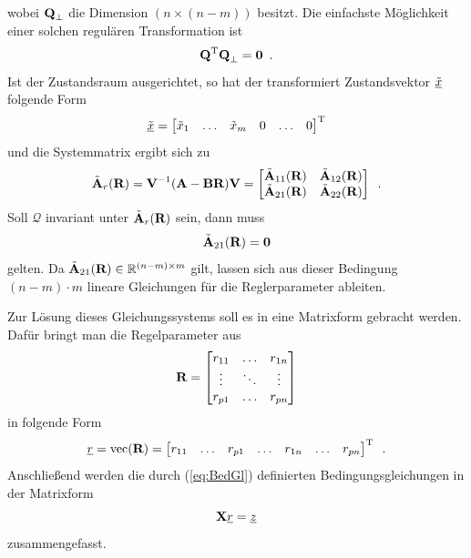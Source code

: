 wobei $\textbf{Q}_{\bot}$ die Dimension $(n \times (n-m))$ besitzt. Die einfachste Möglichkeit einer solchen regulären Transformation ist
\begin{equation}
		\textbf{Q}^{\textnormal{T}} \textbf{Q}_{\bot} = \textbf{0} \, \, \, .
\end{equation}
Ist der Zustandsraum ausgerichtet, so hat der transformiert Zustandsvektor $\underline{\tilde{x}}$ folgende Form
\begin{equation}
	\underline{\tilde{x}} = \begin{bmatrix}
		\tilde{x}_1 &\dots &\tilde{x}_m &0 &\dots &0
	\end{bmatrix}^{\textnormal{T}}
\end{equation} 
und die Systemmatrix ergibt sich zu
\begin{equation}
	\tilde{\textbf{A}}_{r}(\textbf{R}) = \textbf{V}^{-1}(\textbf{A} - \textbf{B}\textbf{R})\textbf{V} = \begin{bmatrix}
		\tilde{\textbf{A}}_{11}(\textbf{R})	&\tilde{\textbf{A}}_{12}(\textbf{R})	\\
		\tilde{\textbf{A}}_{21}(\textbf{R})	&\tilde{\textbf{A}}_{22}(\textbf{R})
	\end{bmatrix} \, \, \, .
\end{equation}
Soll $\mathcal{Q}$ invariant unter $\tilde{\textbf{A}}_{r}(\textbf{R})$ sein, dann muss
\begin{equation}\label{eq:BedGl}
	\tilde{\textbf{A}}_{21}(\textbf{R}) = \textbf{0} 
\end{equation}
gelten.
Da $\tilde{\textbf{A}}_{21}(\textbf{R}) \in \mathbb{R}^{(n-m)\times m} $ gilt, lassen sich aus dieser Bedingung $(n-m)\cdot m$ lineare Gleichungen für die Reglerparameter ableiten.


Zur Lösung dieses Gleichungssystems soll es in eine Matrixform gebracht werden.
Dafür bringt man die Regelparameter aus
\begin{equation}
	\textbf{R} = \begin{bmatrix}
		r_{11} &\dots &r_{1n} \\
		\vdots &\ddots &\vdots \\
		r_{p1} &\dots &r_{pn}
	\end{bmatrix}
\end{equation}
in folgende Form
\begin{equation}
	\underline{r} = \textnormal{vec}(\textbf{R}) = \begin{bmatrix} r_{11} &\dots &r_{p1} &\dots &r_{1n} &\dots &r_{pn} 	\end{bmatrix}^{\textnormal{T}} \, \, \, .
\end{equation}
Anschließend werden die durch (\ref{eq:BedGl}) definierten Bedingungsgleichungen in der Matrixform
\begin{equation}\label{eq:GlSysM}
	\textbf{X}\underline{r} = \underline{z}
\end{equation}
zusammengefasst.

